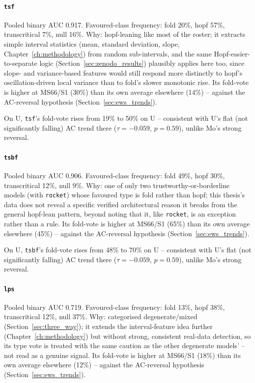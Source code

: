 \paragraph{\texttt{tsf}} Pooled binary AUC 0.917. Favoured-class frequency: fold 20\%, hopf 57\%, transcritical 7\%, null 16\%. Why: hopf-leaning like most of the roster; it extracts simple interval statistics (mean, standard deviation, slope, Chapter~\ref{ch:methodology}) from random sub-intervals, and the same Hopf-easier-to-separate logic (Section~\ref{sec:zenodo_results}) plausibly applies here too, since slope- and variance-based features would still respond more distinctly to hopf's oscillation-driven local variance than to fold's slower monotonic rise. Its fold-vote is higher at MS66/S1 (30\%) than its own average elsewhere (14\%) -- against the AC-reversal hypothesis (Section~\ref{sec:ews_trends}).

On U, \texttt{tsf}'s fold-vote rises from 19\% to 50\% on U -- consistent with U's flat (not significantly falling) AC trend there ($\tau=-0.059$, $p=0.59$), unlike Mo's strong reversal.

\paragraph{\texttt{tsbf}} Pooled binary AUC 0.906. Favoured-class frequency: fold 49\%, hopf 30\%, transcritical 12\%, null 9\%. Why: one of only two trustworthy-or-borderline models (with \texttt{rocket}) whose favoured type is fold rather than hopf; this thesis's data does not reveal a specific verified architectural reason it breaks from the general hopf-lean pattern, beyond noting that it, like \texttt{rocket}, is an exception rather than a rule. Its fold-vote is higher at MS66/S1 (65\%) than its own average elsewhere (45\%) -- against the AC-reversal hypothesis (Section~\ref{sec:ews_trends}).

On U, \texttt{tsbf}'s fold-vote rises from 48\% to 70\% on U -- consistent with U's flat (not significantly falling) AC trend there ($\tau=-0.059$, $p=0.59$), unlike Mo's strong reversal.

\paragraph{\texttt{lps}} Pooled binary AUC 0.719. Favoured-class frequency: fold 13\%, hopf 38\%, transcritical 12\%, null 37\%. Why: categorised degenerate/mixed (Section~\ref{sec:three_way}); it extends the interval-feature idea further (Chapter~\ref{ch:methodology}) but without strong, consistent real-data detection, so its type vote is treated with the same caution as the other degenerate models' -- not read as a genuine signal. Its fold-vote is higher at MS66/S1 (18\%) than its own average elsewhere (12\%) -- against the AC-reversal hypothesis (Section~\ref{sec:ews_trends}).

